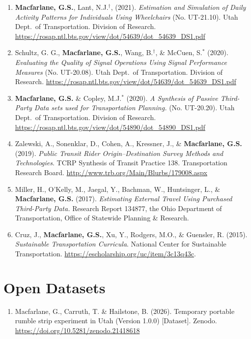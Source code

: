 \documentclass[margin,line]{res}
\newif\ifdetail{}
\newcounter{enuminitialize}
\newenvironment{myenum}[1][]
{%
 \setcounter{enuminitialize}{#1}
 \addtocounter{enuminitialize}{2}
 \begin{enumerate}[left= 4pt, itemsep=8pt, start=\value{enuminitialize}, label=\arabic*\addtocounter{enumi}{-2}]
}
{%
 \end{enumerate}
}
\begin{document}
\begin{resume}
\begin{myenum}[18]
\item \textbf{Macfarlane, G.S.}, Lant, N.J.$^\dagger$, (2021).
  \textit{Estimation and Simulation of Daily Activity Patterns for Individuals
  Using Wheelchairs} (No. UT-21.10). Utah Dept.\ of Transportation. Division of
  Research. \url{https://rosap.ntl.bts.gov/view/dot/54639/dot_54639_DS1.pdf}

\item Schultz, G. G., \textbf{Macfarlane, G.S.}, Wang, B.$^\dagger$, \& McCuen,
  S.$^*$ (2020). \textit{Evaluating the Quality of Signal Operations Using Signal
  Performance Measures} (No. UT-20.08). Utah Dept.\ of Transportation. Division of
  Research. \url{https://rosap.ntl.bts.gov/view/dot/54639/dot_54639_DS1.pdf}

\item \textbf{Macfarlane, G.S.} \& Copley, M.J.$^*$ (2020). \textit{ A Synthesis
  of Passive Third-Party Data sets used for Transportation Planning.} (No.
  UT-20.20). Utah Dept.\ of Transportation. Division of Research.
  \url{https://rosap.ntl.bts.gov/view/dot/54890/dot_54890_DS1.pdf}

\item Zalewski, A., Sonenklar, D., Cohen, A., Kressner, J., \&
  \textbf{Macfarlane, G.S.} (2019). \textit{ Public Transit Rider
  Origin–Destination Survey Methods and Technologies}. TCRP Synthesis of Transit
  Practice 138. Transportation Research Board.
  \url{http://www.trb.org/Main/Blurbs/179008.aspx} \ifdetail Citations: 1  \fi

\item Miller, H., O'Kelly, M., Jaegal, Y., Bachman, W., Huntsinger, L., \&
  \textbf{Macfarlane, G.S.} (2017). \textit{Estimating External Travel Using
  Purchased Third-Party Data.} Research Report 134877, the Ohio Department of
  Transportation, Office of Statewide Planning \& Research. \ifdetail Citations: 1 \fi

\item Cruz, J., \textbf{Macfarlane, G.S.}, Xu, Y., Rodgers, M.O., \& Guensler,
  R. (2015). \textit{Sustainable Transportation Curricula}. National Center for
  Sustainable Transportation. \url{https://escholarship.org/uc/item/3c13q43c}.
\end{myenum}

\section{Open Datasets}
\ifdetail
These are datasets that I have created or contributed to and included in versioned repositories.
\fi
\vspace{0.3cm}
\begin{myenum}[1]
  \ifdetail{\color{NavyBlue} \fi
  \item Macfarlane, G., Carruth, T. \& Hailstone, B. (2026). Temporary portable rumble strip experiment in Utah (Version 1.0.0) [Dataset]. Zenodo. \url{https://doi.org/10.5281/zenodo.21418618}
  \ifdetail} \fi


\end{myenum}
\end{resume}
\end{document}
